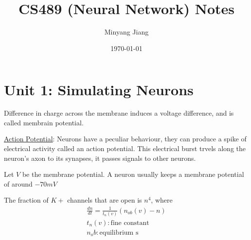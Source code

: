 \documentclass[letterpaper]{article}
\title{\huge CS489 (Neural Network) Notes}
\author{Minyang Jiang}
\date{\today}
\begin{document}
\maketitle

\section{Unit 1: Simulating Neurons}

Difference in charge across the membrane induces a voltage difference, and is called membrain potential.

\underline{Action Potential}: Neurons have a peculiar behaviour, they can produce a spike of electrical activity called an action potential. This electrical burst trvels along the neuron's axon to its synapses, it passes signals to other neurons.

Let $V$ be the membrane potential. A neuron usually keeps a membrane potential of around $-70mV$

The fraction of $K+$ channels that are open is $n^4$, where
\begin{align*}
	\frac{dn}{dt}=\frac{1}{t_n(v)}(n_{ob}(v)- n)\\
	t_n(v): \text{fine constant}\\
	n_ob: \text{equilibrium s}
\end{align*}















			
			
\end{document}
